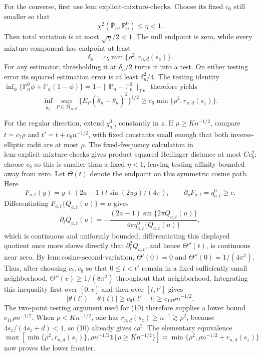 For the converse, first use \(\mathrm{lem{:}explicit\text{-}mixture\text{-}checks}\).  Choose its fixed \(c_0\) still smaller so that
\[
 \chi^2(\overline{\mathbb P}_n,\mathbb P_n^0)\le\eta<1.
\]
Then total variation is at most \(\sqrt\eta/2<1\).  The null endpoint is zero, while every mixture component has endpoint at least
\[
 \delta_n=c_5\min\{\rho^2,r_{n,d}(s_z)\}.
\]
For any estimator, thresholding it at \(\delta_n/2\) turns it into a test.  On either testing error its squared estimation error is at least \(\delta_n^2/4\).  The testing identity \(\inf_\phi\{\mathbb P_n^0\phi+\overline{\mathbb P}_n(1-\phi)\}=1-\|\overline{\mathbb P}_n-\mathbb P_n^0\|_{\mathrm{TV}}\) therefore yields
\[
 \inf_{\widetilde\theta_n}\sup_{P\in\mathcal M_{n,d}}
 \{E_P(\widetilde\theta_n-\theta_n)^2\}^{1/2}
 \ge c_6\min\{\rho^2,r_{n,d}(s_z)\}. \tag{10}
\]

For the regular direction, extend \(q_{a,t}^0\) constantly in \(z\).  If \(\rho\ge K n^{-1/2}\), compare \(t=c_7\rho\) and \(t'=t+c_8n^{-1/2}\), with fixed constants small enough that both inverse-elliptic radii are at most \(\rho\).  The fixed-frequency calculation in \(\mathrm{lem{:}explicit\text{-}mixture\text{-}checks}\) gives product squared Hellinger distance at most \(C c_8^2\); choose \(c_8\) so this is smaller than a fixed \(\eta<1\), leaving testing affinity bounded away from zero.  Let \(\Theta(t)\) denote the endpoint on this symmetric cosine path.  Here
\[
 F_{a,t}(y)=y+(2a-1)t\sin(2\pi y)/(4\pi),
 \qquad \partial_yF_{a,t}=q_{a,t}^0\ge c.
\]
Differentiating \(F_{a,t}\{Q_{a,t}(u)\}=u\) gives
\[
 \partial_tQ_{a,t}(u)=
 -\frac{(2a-1)\sin\{2\pi Q_{a,t}(u)\}}{4\pi q_{a,t}^0\{Q_{a,t}(u)\}},
\]
which is continuous and uniformly bounded; differentiating this displayed quotient once more shows directly that \(\partial_t^2Q_{a,t}\), and hence \(\Theta''(t)\), is continuous near zero.  By \(\mathrm{lem{:}cosine\text{-}second\text{-}variation}\), \(\Theta'(0)=0\) and \(\Theta''(0)=1/(4\pi^2)\).  Thus, after choosing \(c_7,c_8\) so that \(0\le t<t'\) remain in a fixed sufficiently small neighborhood, \(\Theta''(v)\ge1/(8\pi^2)\) throughout that neighborhood.  Integrating this inequality first over \([0,v]\) and then over \([t,t']\) gives
\[
 |\theta(t')-\theta(t)|
 \ge c_9 t|t'-t|
 \ge c_{10}\rho n^{-1/2}. \tag{11}
\]
The two-point testing argument used for (10) therefore supplies a lower bound \(c_{11}\rho n^{-1/2}\).  When \(\rho<K n^{-1/2}\), one has \(r_{n,d}(s_z)\ge n^{-1}\gtrsim\rho^2\), because \(4s_z/(4s_z+d)<1\), so (10) already gives \(c\rho^2\).  The elementary equivalence
\[
 \max\!\left[\min\{\rho^2,r_{n,d}(s_z)\},
                   \rho n^{-1/2}\mathbf 1\{\rho\ge Kn^{-1/2}\}\right]
 \asymp
 \min\{\rho^2,\rho n^{-1/2}+r_{n,d}(s_z)\} \tag{12}
\]
now proves the lower frontier.

